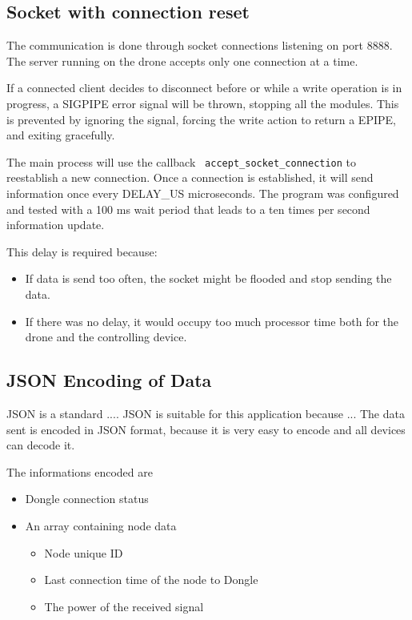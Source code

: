 \subsection{Socket with connection reset}

The communication is done through socket connections listening on port 8888. The server running on the drone accepts only one connection at a time.

If a connected client decides to disconnect before or while a write operation is in progress, a SIGPIPE error signal will be thrown, stopping all the modules. This is prevented by ignoring the signal, forcing the write action to return a EPIPE, and exiting gracefully.

The main process will use the callback \texttt{ accept\_socket\_connection} to reestablish a new connection. Once a connection is established, it will send information once every DELAY\_US microseconds. The program was configured and tested with a 100 ms wait period that leads to a ten times per second information update.

This delay is required because:
\begin{itemize}

\item If data is send too often, the socket might be flooded and stop sending the data. %
\item If there was no delay, it would occupy too much processor time both for the drone and the controlling device.

\end{itemize}

\subsection{JSON Encoding of Data}

JSON is a standard ....
JSON is suitable for this application because ...
The data sent is encoded in JSON format, because it is very easy to encode and all devices can decode it.

The informations encoded are
\begin{itemize}

\item Dongle connection status
\item An array containing node data
\begin{itemize}

	\item Node unique ID
	\item Last connection time of the node to Dongle
	\item The power of the received signal

	\end{itemize}
\end{itemize}


